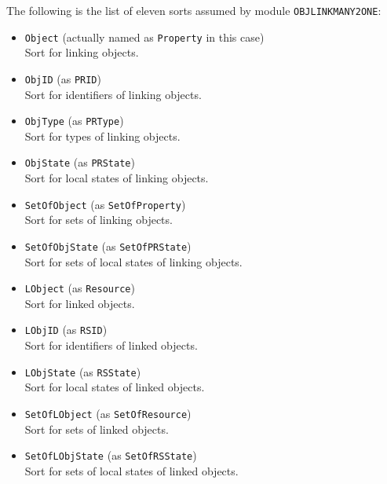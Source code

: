 \documentclass[12pt]{report}
\newcommand{\stt}[1]{{\small{\tt {#1}}}}
\begin{document}
\normalsize
The following is the list of eleven sorts assumed by
module {\tt OBJLINKMANY2ONE}:
\begin{itemize}
\item \stt{Object} (actually named as \stt{Property} in this case)\\
  Sort for linking objects.
\item \stt{ObjID} (as \stt{PRID})\\
  Sort for identifiers of linking objects.
\item \stt{ObjType} (as \stt{PRType})\\
  Sort for types of linking objects.
\item \stt{ObjState} (as \stt{PRState})\\
  Sort for local states of linking objects.
\item \stt{SetOfObject} (as \stt{SetOfProperty})\\
  Sort for sets of linking objects.
\item \stt{SetOfObjState} (as \stt{SetOfPRState})\\
  Sort for sets of local states of linking objects.
\item \stt{LObject} (as \stt{Resource})\\
  Sort for linked objects.
\item \stt{LObjID} (as \stt{RSID})\\
  Sort for identifiers of linked objects.
\item \stt{LObjState} (as \stt{RSState})\\
  Sort for local states of linked objects.
\item \stt{SetOfLObject} (as \stt{SetOfResource})\\
  Sort for sets of linked objects.
\item \stt{SetOfLObjState} (as \stt{SetOfRSState})\\
  Sort for sets of local states of linked objects.
\end{itemize}
\end{document}

